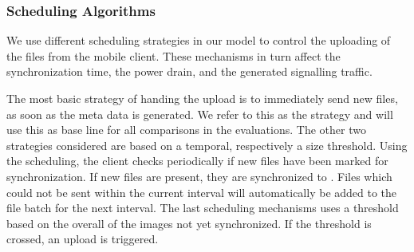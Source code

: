 \subsubsection*{Scheduling Algorithms}\label{sec:application:cloud_file_synchronisation:system_model:algorithms}
We use different scheduling strategies in our model to control the uploading of the files from the mobile client.
These mechanisms in turn affect the synchronization time, the power drain, and the generated signalling traffic.

The most basic strategy of handing the upload is to immediately send new files, as soon as the meta data is generated.
We refer to this as the \algoimmediate strategy and will use this as base line for all comparisons in the evaluations.
The other two strategies considered are based on a temporal, respectively a size threshold. 
Using the \algointerval scheduling, the client checks periodically if new files have been marked for synchronization.
If new files are present, they are synchronized to \dropbox.
Files which could not be sent within the current interval will automatically be added to the file batch for the next interval. 
The last scheduling mechanisms uses a threshold based on the overall \algosize of the images not yet synchronized.
If the threshold is crossed, an upload is triggered.
